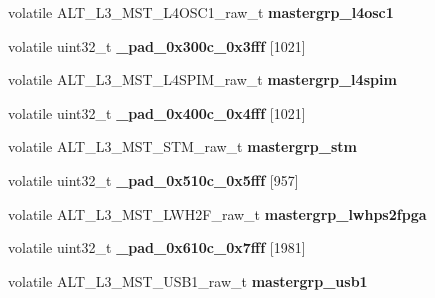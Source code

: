 \begin{DoxyCompactItemize}
volatile A\+L\+T\+\_\+\+L3\+\_\+\+M\+S\+T\+\_\+\+L4\+O\+S\+C1\+\_\+raw\+\_\+t {\bfseries mastergrp\+\_\+l4osc1}
\item 
\mbox{\label{structALT__L3__MSTGRP__raw__s_a9ba4fed2b361a0b3f3f219a9f314d2a8}} 
volatile uint32\+\_\+t {\bfseries \+\_\+pad\+\_\+0x300c\+\_\+0x3fff} \mbox{[}1021\mbox{]}
\item 
\mbox{\label{structALT__L3__MSTGRP__raw__s_a798eeffa865796da1bfdaf1820ec600c}} 
volatile A\+L\+T\+\_\+\+L3\+\_\+\+M\+S\+T\+\_\+\+L4\+S\+P\+I\+M\+\_\+raw\+\_\+t {\bfseries mastergrp\+\_\+l4spim}
\item 
\mbox{\label{structALT__L3__MSTGRP__raw__s_a6a618e282449069a4e927acd48ae86f9}} 
volatile uint32\+\_\+t {\bfseries \+\_\+pad\+\_\+0x400c\+\_\+0x4fff} \mbox{[}1021\mbox{]}
\item 
\mbox{\label{structALT__L3__MSTGRP__raw__s_a895051f6a9efd2a23d26e5eb72b414c8}} 
volatile A\+L\+T\+\_\+\+L3\+\_\+\+M\+S\+T\+\_\+\+S\+T\+M\+\_\+raw\+\_\+t {\bfseries mastergrp\+\_\+stm}
\item 
\mbox{\label{structALT__L3__MSTGRP__raw__s_ab4cbc96dbff6a2c70cf9e87a6f4e181c}} 
volatile uint32\+\_\+t {\bfseries \+\_\+pad\+\_\+0x510c\+\_\+0x5fff} \mbox{[}957\mbox{]}
\item 
\mbox{\label{structALT__L3__MSTGRP__raw__s_aa48e82966a173d7cb7566297548ea864}} 
volatile A\+L\+T\+\_\+\+L3\+\_\+\+M\+S\+T\+\_\+\+L\+W\+H2\+F\+\_\+raw\+\_\+t {\bfseries mastergrp\+\_\+lwhps2fpga}
\item 
\mbox{\label{structALT__L3__MSTGRP__raw__s_a433f071ea3170d465c413d7ef9ce53db}} 
volatile uint32\+\_\+t {\bfseries \+\_\+pad\+\_\+0x610c\+\_\+0x7fff} \mbox{[}1981\mbox{]}
\item 
\mbox{\label{structALT__L3__MSTGRP__raw__s_a978a5c3477f912944a616ece78040118}} 
volatile A\+L\+T\+\_\+\+L3\+\_\+\+M\+S\+T\+\_\+\+U\+S\+B1\+\_\+raw\+\_\+t {\bfseries mastergrp\+\_\+usb1}
\item 
\mbox{\label{structALT__L3__MSTGRP__raw__s_a3111417c0db4b520fe1a1fcf9fbed702}} 

\end{DoxyCompactItemize}
